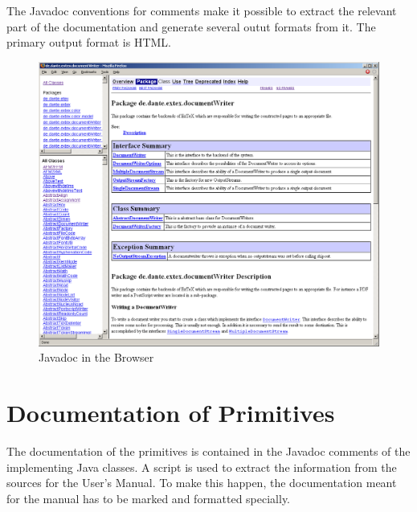 The Javadoc conventions for comments make it possible to extract the
relevant part of the documentation and generate several outut formats
from it. The primary output format is HTML.
\begin{figure}[tbh]
  \centering
  \includegraphics[scale=.33]{image/javadoc}
  \caption{Javadoc in the Browser}\label{fig:eclipse-javadoc}
\end{figure}


\section{Documentation of Primitives}

The documentation of the primitives is contained in the
Javadoc comments of the implementing Java classes. A
script is used to extract the information from the sources for the
User's Manual. To make this happen, the documentation meant for the
manual has to be marked and formatted specially.

\INCOMPLETE


